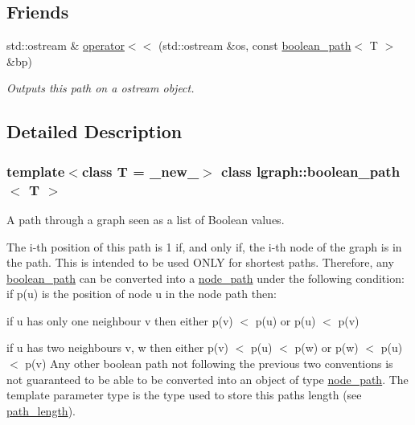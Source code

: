 \subsection*{Friends}
\begin{DoxyCompactItemize}
\item 
std\+::ostream \& \hyperlink{classlgraph_1_1boolean__path_a3f1b01270c5ffdd0f7ce524dc1e29725}{operator$<$$<$} (std\+::ostream \&os, const \hyperlink{classlgraph_1_1boolean__path}{boolean\+\_\+path}$<$ T $>$ \&bp)
\begin{DoxyCompactList}\small\item\em Outputs this path on a {\itshape ostream} object. \end{DoxyCompactList}\end{DoxyCompactItemize}


\subsection{Detailed Description}
\subsubsection*{template$<$class T = \+\_\+new\+\_\+$>$\newline
class lgraph\+::boolean\+\_\+path$<$ T $>$}

A path through a graph seen as a list of Boolean values. 

The i-\/th position of this path is 1 if, and only if, the i-\/th node of the graph is in the path. This is intended to be used O\+N\+LY for shortest paths. Therefore, any \hyperlink{classlgraph_1_1boolean__path}{boolean\+\_\+path} can be converted into a \hyperlink{classlgraph_1_1node__path}{node\+\_\+path} under the following condition\+: if p(u) is the position of node \textquotesingle{}u\textquotesingle{} in the node path then\+:
\begin{DoxyItemize}
\item if u has only one neighbour \textquotesingle{}v\textquotesingle{} then either p(v) $<$ p(u) or p(u) $<$ p(v)
\item if u has two neighbours \textquotesingle{}v\textquotesingle{}, \textquotesingle{}w\textquotesingle{} then either p(v) $<$ p(u) $<$ p(w) or p(w) $<$ p(u) $<$ p(v) Any other boolean path not following the previous two conventions is not guaranteed to be able to be converted into an object of type \textquotesingle{}\hyperlink{classlgraph_1_1node__path}{node\+\_\+path}\textquotesingle{}. The template parameter type is the type used to store this path\textquotesingle{}s length (see \hyperlink{classlgraph_1_1boolean__path_ab298ac156fd7d73e21769fd30b2c5ad1}{path\+\_\+length}).
\end{DoxyItemize}


